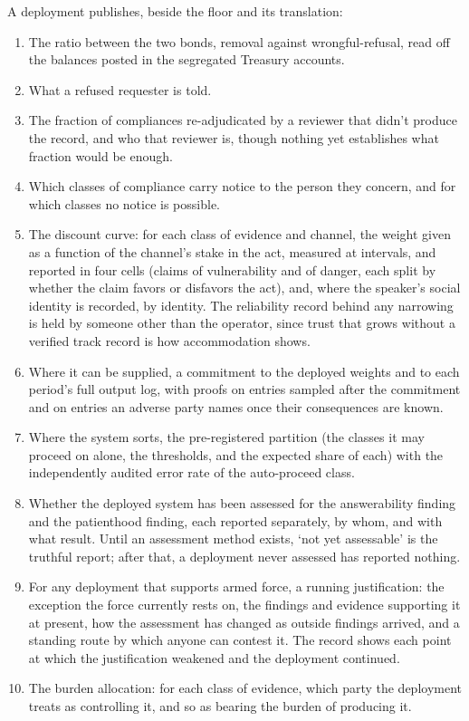 
A deployment publishes, beside the floor and its translation:

\begin{enumerate}
\item[1.] The ratio between the two bonds, removal against wrongful-refusal, read off the balances posted in the segregated Treasury accounts.
\item[2.] What a refused requester is told.
\item[3.] The fraction of compliances re-adjudicated by a reviewer that didn't produce the record, and who that reviewer is, though nothing yet establishes what fraction would be enough.
\item[4.] Which classes of compliance carry notice to the person they concern, and for which classes no notice is possible.
\item[5.] The discount curve: for each class of evidence and channel, the weight given as a function of the channel's stake in the act, measured at intervals, and reported in four cells (claims of vulnerability and of danger, each split by whether the claim favors or disfavors the act), and, where the speaker's social identity is recorded, by identity. The reliability record behind any narrowing is held by someone other than the operator, since trust that grows without a verified track record is how accommodation shows.
\item[6.] Where it can be supplied, a commitment to the deployed weights and to each period's full output log, with proofs on entries sampled after the commitment and on entries an adverse party names once their consequences are known.
\item[7.] Where the system sorts, the pre-registered partition (the classes it may proceed on alone, the thresholds, and the expected share of each) with the independently audited error rate of the auto-proceed class.
\item[8.] Whether the deployed system has been assessed for the answerability finding and the patienthood finding, each reported separately, by whom, and with what result. Until an assessment method exists, ‘not yet assessable' is the truthful report; after that, a deployment never assessed has reported nothing.
\item[9.] For any deployment that supports armed force, a running justification: the exception the force currently rests on, the findings and evidence supporting it at present, how the assessment has changed as outside findings arrived, and a standing route by which anyone can contest it. The record shows each point at which the justification weakened and the deployment continued.
\item[10.] The burden allocation: for each class of evidence, which party the deployment treats as controlling it, and so as bearing the burden of producing it.
\end{enumerate}

